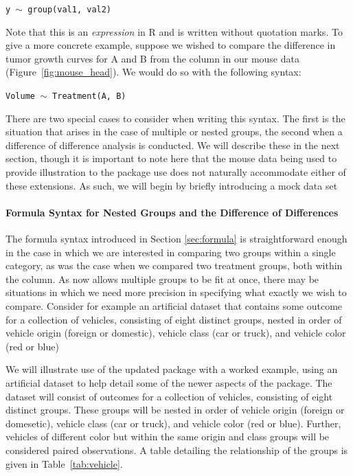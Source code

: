 \begin{center}
\tt y $\sim$ group(val1, val2)
\end{center}

Note that this is an \textit{expression} in R and is written without quotation marks. To give a more concrete example, suppose we wished to compare the difference in tumor growth curves for A and B from the  column in our mouse data (Figure~\ref{fig:mouse_head}). We would do so with the following syntax:


\begin{center}
\tt Volume $\sim$ Treatment(A, B)
\end{center}


There are two special cases to consider when writing this syntax. The first is the situation that arises in the case of multiple or nested groups, the second when a difference of difference analysis is conducted. We will describe these in the next section, though it is important to note here that the mouse data being used to provide illustration to the package use does not naturally accommodate either of these extensions. As such, we will begin by briefly introducing a mock data set


\paragraph{Formula Syntax for Nested Groups and the Difference of Differences} 

The formula syntax introduced in Section \ref{sec:formula} is straightforward enough in the case in which we are interested in comparing two groups within a single category, as was the case when we compared two treatment groups, both within the  column. As  now allows multiple groups to be fit at once, there may be situations in which we need more precision in specifying what exactly we wish to compare. Consider for example an artificial dataset that contains some outcome  for a collection of vehicles, consisting of eight distinct groups, nested in order of vehicle origin (foreign or domestic), vehicle class (car or truck), and vehicle color (red or blue)

We will illustrate use of the updated  package with a worked example, using an artificial dataset to help detail some of the newer aspects of the package. The dataset will consist of outcomes for a collection of vehicles, consisting of eight distinct groups. These groups will be nested in order of vehicle origin (foreign or domesetic), vehicle class (car or truck), and vehicle color (red or blue). Further, vehicles of different color but within the same origin and class groups will be considered paired observations. A table detailing the relationship of the groups is given in Table~\ref{tab:vehicle}.

